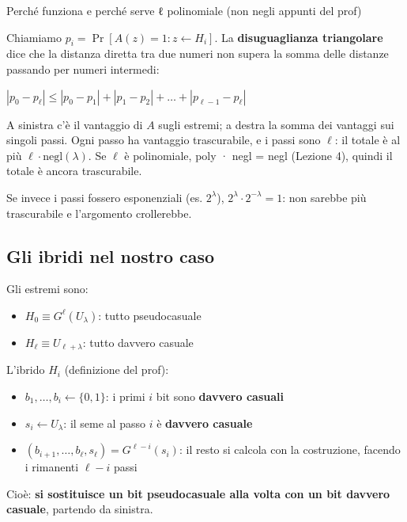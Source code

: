 \begin{approfondimento}{Perché funziona e perché serve ℓ polinomiale (non negli appunti del
prof)}

Chiamiamo \(p_i = \Pr[A(z) = 1 : z \leftarrow H_i]\). La \textbf{disuguaglianza triangolare} dice che la distanza diretta tra due numeri non supera la somma delle distanze passando per numeri intermedi:

\(|p_0 - p_\ell| \le |p_0 - p_1| + |p_1 - p_2| + \dots + |p_{\ell-1} - p_\ell|\)

A sinistra c'è il vantaggio di \(A\) sugli estremi; a destra la somma dei vantaggi sui singoli passi. Ogni passo ha vantaggio trascurabile, e i passi sono \(\ell\): il totale è al più \(\ell \cdot \text{negl}(\lambda)\). Se \(\ell\) è polinomiale, poly · negl = negl (Lezione 4), quindi il totale è ancora trascurabile.

Se invece i passi fossero esponenziali (es. \(2^\lambda\)), \(2^\lambda \cdot 2^{-\lambda} = 1\): non sarebbe più trascurabile e l'argomento crollerebbe.

\end{approfondimento}

\subsection{Gli ibridi nel nostro caso}

Gli estremi sono:

\begin{itemize}
\tightlist
\item
  \(H_0 \equiv G^\ell(U_\lambda)\): tutto pseudocasuale
\item
  \(H_\ell \equiv U_{\ell + \lambda}\): tutto davvero casuale
\end{itemize}

L'ibrido \(H_i\) (definizione del prof):

\begin{itemize}
\tightlist
\item
  \(b_1, \dots, b_i \leftarrow \{0,1\}\): i primi \(i\) bit sono \textbf{davvero casuali}
\item
  \(s_i \leftarrow U_\lambda\): il seme al passo \(i\) è \textbf{davvero casuale}
\item
  \((b_{i+1}, \dots, b_\ell, s_\ell) = G^{\ell - i}(s_i)\): il resto si calcola con la costruzione, facendo i rimanenti \(\ell - i\) passi
\end{itemize}

Cioè: \textbf{si sostituisce un bit pseudocasuale alla volta con un bit davvero casuale}, partendo da sinistra.


